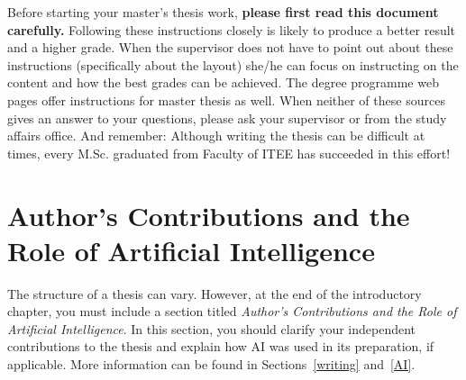 Before starting your master’s thesis work, \textbf{please first read this document carefully.} Following these instructions closely is likely to produce a better result and a higher grade. When the supervisor does not have to point out about these instructions (specifically about the layout) she/he can focus on instructing on the content and how the best grades can be achieved. The degree programme web pages \cite{mscstudies} offer instructions for master thesis as well. When neither of these sources gives an answer to your questions, please ask your supervisor or from the study affairs office. And remember: Although writing the thesis can be difficult at times, every M.Sc. graduated from Faculty of ITEE has succeeded in this effort!

\section{Author's Contributions and the Role of Artificial Intelligence}

The structure of a thesis can vary. However, at the end of the introductory chapter, you must include a section titled \textit{Author's Contributions and the Role of Artificial Intelligence}. In this section, you should clarify your independent contributions to the thesis and explain how AI was used in its preparation, if applicable. More information can be found in Sections~\ref{writing} and~\ref{AI}.
